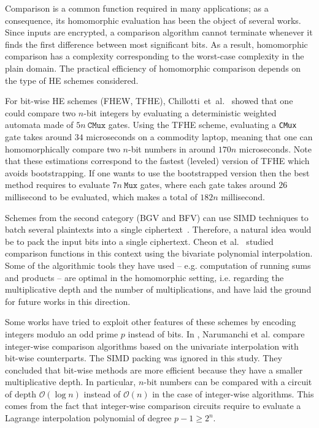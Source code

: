 Comparison is a common function required in many applications; as a consequence, its homomorphic evaluation has been the object of several works.
Since inputs are encrypted, a comparison algorithm cannot terminate whenever it finds the first difference between most significant bits. 
As a result, homomorphic comparison has a complexity corresponding to the worst-case complexity in the plain domain. 
The practical efficiency of homomorphic comparison depends on the type of HE schemes considered.

For bit-wise HE schemes (FHEW, TFHE), Chillotti~et~al.~\cite{AC:CGGI17,JC:CGGI20} showed that one could compare two $n$-bit integers by evaluating a deterministic weighted automata made of $5n~\texttt{CMux}$ gates. 
Using the TFHE scheme, evaluating a \texttt{CMux} gate takes around $34$ microseconds on a commodity laptop, meaning that one can homomorphically compare two $n$-bit numbers in around $170n$ microseconds. 
Note that these estimations correspond to the fastest (leveled) version of TFHE which avoids bootstrapping. 
If one wants to use the bootstrapped version then the best method requires to evaluate $7n~\texttt{Mux}$ gates, where each gate takes around $26$ millisecond to be evaluated, which makes a total of $182n$ millisecond.

Schemes from the second category (BGV and BFV) can use \ac{SIMD} techniques to batch several plaintexts into a single ciphertext~\cite{SV14}. 
Therefore, a natural idea would be to pack the input bits into a single ciphertext. 
Cheon et al.~\cite{CKK15,CKK16} studied comparison functions in this context using the bivariate polynomial interpolation. 
Some of the algorithmic tools they have used -- e.g. computation of running sums and products -- are optimal in the homomorphic setting, i.e. regarding the multiplicative depth and the number of multiplications, and have laid the ground for future works in this direction.

Some works have tried to exploit other features of these schemes by encoding integers modulo an odd prime $p$ instead of bits. 
In \cite{NGEG17}, Narumanchi et al. compare integer-wise comparison algorithms based on the univariate interpolation with bit-wise counterparts.
The SIMD packing was ignored in this study.
They concluded that bit-wise methods are more efficient because they have a smaller multiplicative depth.
In particular, $n$-bit numbers can be compared with a circuit of depth $\mathcal{O}(\log n)$ instead of $\mathcal{O}(n)$ in the case of integer-wise algorithms.
This comes from the fact that integer-wise comparison circuits require to evaluate a Lagrange interpolation polynomial of degree $p-1 \geq 2^n$.

